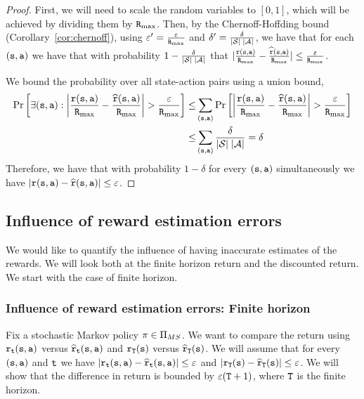 \begin{proof}
First, we will need to scale the random variables to $[0,1]$, which
will be achieved by dividing them by ${\tt R}_{\max }$. Then, by the
Chernoff-Hoffding bound (Corollary~\ref{cor:chernoff}), using
$\varepsilon'= \frac{\varepsilon}{{\tt R}_{\max }}$ and $\delta'=
\frac{\delta}{|\mathcal{S}|\;|\mathcal{A}|}$, we have that for each
$({\tt s},{\tt a})$ we have that with probability
$1-\frac{\delta}{|\mathcal{S}|\;|\mathcal{A}|}$ that
$|\frac{{\tt r}({\tt s},{\tt a})}{{\tt R}_{\max }}-\frac{\widehat{{\tt r}}({\tt s},{\tt a})}{{\tt R}_{\max }}|\leq
\frac{\varepsilon}{{\tt R}_{\max }}$.

We bound the probability over all state-action pairs using a union
bound,
\begin{align*}
\Pr\left[\exists ({\tt s},{\tt a}):
\left|\frac{{\tt r}({\tt s},{\tt a})}{{\tt R}_{\max }}-\frac{\widehat{{\tt r}}({\tt s},{\tt a})}{{\tt R}_{\max }}\right|
> \frac{\varepsilon}{{\tt R}_{\max }}\right] \leq &
\sum_{({\tt s},{\tt a})} \Pr\left[
\left|\frac{{\tt r}({\tt s},{\tt a})}{{\tt R}_{\max }}-\frac{\widehat{{\tt r}}({\tt s},{\tt a})}{{\tt R}_{\max }}\right|
> \frac{\varepsilon}{{\tt R}_{\max }}\right] \\
\leq & \sum_{({\tt s},{\tt a})}
\frac{\delta}{|\mathcal{S}|\;|\mathcal{A}|}=\delta
\end{align*}
 Therefore,
we have that with probability $1-\delta$ for every
$({\tt s},{\tt a})$ simultaneously we have
$|{\tt r}({\tt s},{\tt a})-\widehat{{\tt r}}({\tt s},{\tt a})|\leq
\varepsilon$.
\end{proof}

\subsection{Influence of reward estimation errors}

We would like to quantify the influence of having inaccurate
estimates of the rewards. We will look both at the finite horizon
return and the discounted return. We start with the case of finite
horizon.

\subsubsection{Influence of reward estimation errors: Finite horizon}

Fix a stochastic Markov policy $\pi\in  {\Pi _{MS}}$. We want
to compare the return using ${\tt r}_{\tt t}({\tt s},{\tt a})$ versus
$\widehat{{\tt r}}_{\tt t}({\tt s},{\tt a})$ and ${\tt r}_{\tt T}({\tt s})$
versus $\widehat{{\tt r}}_{\tt T}({\tt s})$. We will assume that
for every $({\tt s},{\tt a})$ and ${\tt t}$ we have
$|{\tt r}_{\tt t}({\tt s},{\tt a})-\widehat{{\tt r}}_{\tt t}({\tt s},{\tt a})|\leq
\varepsilon$ and
$|{\tt r}_{\tt T}({\tt s})-\widehat{{\tt r}}_{\tt T}({\tt s})|\leq
\varepsilon$. We will show that the difference in return is bounded
by $\varepsilon({\tt T}+1)$, where ${\tt T}$ is the finite
horizon.


